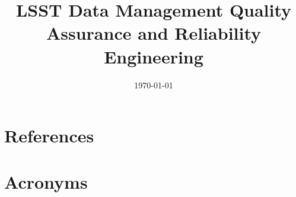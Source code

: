 \documentclass[modern]{aastex62}
\begin{document}

\date{\today}
\title{LSST Data Management Quality Assurance and Reliability Engineering}








\appendix

\section{References} \label{sec:bib}



\section{Acronyms} \label{sec:acronyms}

\end{document}
